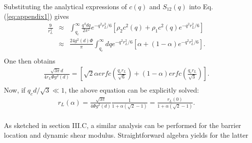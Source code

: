 \documentclass[twocolumn,showpacs,preprintnumbers,amsmath,amssymb,unsortedaddress,
]{revtex4-1}
\begin{document}
Substituting the analytical expressions of $c(q)$ and $S_{12}(q)$ into Eq.(\ref{eq:appendix1}) gives
\begin{eqnarray}
\frac{9}{r_L^2} &\approx& \int_{q_c}^\infty \frac{q^4d{q}}{
2\pi^2}e^{-q^2r_{L}^2/6}\left[\rho_2c^2(q)+\rho_1c^2(q)e^{-q^2r_{L}^2/6} \right] \nonumber\\
&\approx& \frac{24g^2(d)\Phi}{\pi}\int_{q_c}^\infty d{q}e^{-q^2r_{L}^2/6}\left[\alpha+(1-\alpha)e^{-q^2r_{L}^2/6} \right]. \nonumber\\
\label{eq:appendix3}
\end{eqnarray}
One then obtains
\begin{eqnarray}
\frac{\sqrt{3\pi}d}{4r_{L}\Phi g^2(d)}= \left[\sqrt{2}\alpha erfc\left(\frac{q_cr_{L}}{\sqrt{6}}\right)+ (1-\alpha)erfc\left(\frac{q_cr_{L}}{\sqrt{3}}\right) \right].\nonumber\\
\label{eq:appendix4}
\end{eqnarray}
Now, if  $q_cd/\sqrt{3} \ll 1$, the above equation can be explicitly solved:
\begin{eqnarray}
r_{L}(\alpha) = \frac{\sqrt{3\pi}}{4\Phi g^2(d)} \frac{1}{1+\alpha(\sqrt{2}-1) } = \frac{r_{L}(0)}{1+\alpha(\sqrt{2}-1)}.\nonumber\\
\label{eq:appendix5}
\end{eqnarray}

As sketched in section III.C, a similar analysis can be performed for the barrier location and dynamic shear modulus. Straightforward algebra yields for the latter 
\end{document}
